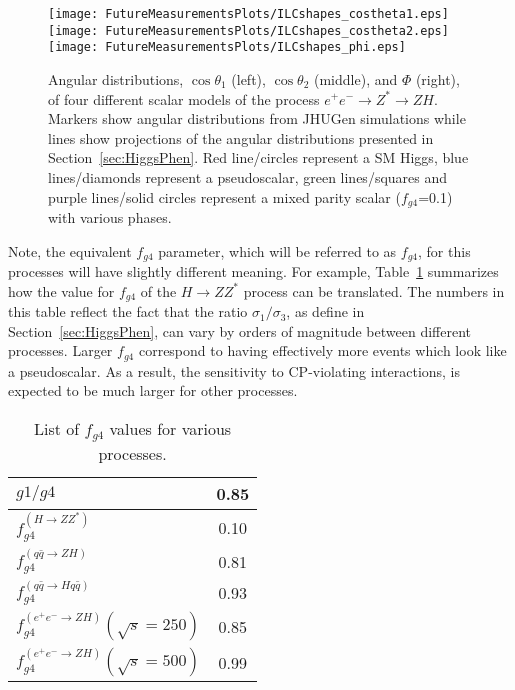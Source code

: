 \begin{figure}
\begin{center}
\texttt{[image: FutureMeasurementsPlots/ILCshapes\_costheta1.eps]}
\texttt{[image: FutureMeasurementsPlots/ILCshapes\_costheta2.eps]}
\texttt{[image: FutureMeasurementsPlots/ILCshapes\_phi.eps]}
\caption{Angular distributions, $\cos\theta_1$ (left), 
$\cos\theta_2$ (middle), and $\Phi$ (right), of four different 
scalar models of the process $e^+e^-\to Z^*\to ZH$.  Markers
show angular distributions from JHUGen simulations while
lines show projections of the angular distributions presented
in Section~\ref{sec:HiggsPhen}. Red line/circles represent a 
SM Higgs, blue lines/diamonds represent a pseudoscalar, green
lines/squares and purple lines/solid circles represent a 
mixed parity scalar ($f_{g4}$=0.1) with various phases.}
\label{fig:ILCprojections}
\end{center}
\end{figure}

Note, the equivalent $f_{g4}$ parameter, which will be referred
to as $f_{g4}$, for this processes will 
have slightly different meaning.  For example, 
Table~\ref{table:fa3Conversion} summarizes
how the value for $f_{g4}$ of the $H\to ZZ^*$ process can be 
translated.  The numbers in this table reflect the fact that 
the ratio $\sigma_1/\sigma_3$, as define in 
Section~\ref{sec:HiggsPhen}, can vary by orders of magnitude
between different processes.  Larger $f_{g4}$ correspond to having
effectively more events which look like a pseudoscalar.  As a 
result, the sensitivity to CP-violating interactions, is
expected to be much larger for other processes.  

\begin{table}
\begin{center}
\begin{tabular}{l|c}
\large $g1/g4$                   & 0.85  \vspace{.1cm} \\
\hline\hline                          
\large $f_{g4}^{(H\to ZZ^*)}$          & 0.10  \vspace{.1cm} \\
\large $f_{g4}^{(q\bar{q}\to ZH)}$      & 0.81  \vspace{.1cm} \\ 
\large $f_{g4}^{(q\bar{q}\to Hq\bar{q})}$ & 0.93  \vspace{.1cm} \\
\large $f_{g4}^{(e^+e^-\to ZH)}(\sqrt{s}=250)$ & 0.85   \vspace{.1cm} \\
\large $f_{g4}^{(e^+e^-\to ZH)}(\sqrt{s}=500)$ & 0.99  \vspace{.1cm} \\
\hline
\hline
\end{tabular}
\end{center}
\label{table:fa3Conversion}
\caption{List of $f_{g4}$ values for various processes.}
\end{table}

